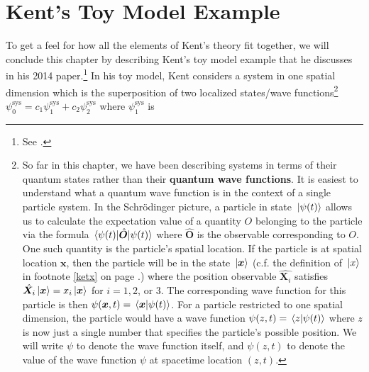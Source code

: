  
\section{Kent's Toy Model Example}\label{toysection}
To get a feel for how all the elements of Kent's theory fit together, we will conclude this chapter by describing Kent's toy model example that he discusses in his 2014 paper.\footnote{See \cite[p. 3--4]{Kent2014}.} In his toy model, Kent considers a system in one spatial dimension which is the superposition of two localized states/wave functions\footnote{So far in this chapter, we have been describing systems in terms of their quantum states rather than their \textbf{quantum wave functions}.\label{wavefunctionfootnote} It is easiest to understand what a quantum wave function is in the context of a single particle system. In the Schr\"{o}dinger picture, a particle in state $\ket*{\psi(t)}$ allows us to calculate the expectation value of a quantity $O$ belonging to the particle via the formula $\ev{\hat{\bm{O}}}{\psi(t)}$ where $\hat{\bm{O}}$ is the observable corresponding to $O$. One such quantity is the particle's spatial location. If the particle is at spatial location $\bm{x}$, then the particle will be in the state $\ket*{\bm{x}}$ (c.f. the definition of $\ket*{x}$ in footnote \ref{ketx} on page \pageref{ketx}.) where the position observable $\hat{\bm{X}_i}$ satisfies $\hat{\bm{X}_i}\ket*{\bm{x}}=x_i\ket*{\bm{x}}$ for $i=1,2$, or $3$. The corresponding wave function for this particle is then   $\psi(\bm{x}, t)=\ip*{\bm{x}}{\psi(t)}$. For a particle restricted to one spatial dimension, the particle would have a wave function $\psi(z, t)=\ip*{z}{\psi(t)}$ where $z$ is now just a single number that specifies the particle's possible position. We will write $\psi$ to denote the wave function itself, and $\psi(z,t)$ to denote the value of the wave function $\psi$ at spacetime location $(z,t)$.}  $\psi_0^\text{sys}=c_1 \psi_1^\text{sys}+c_2\psi_2^\text{sys}$ where %
%
 $\psi_1^\text{sys}$ is %
